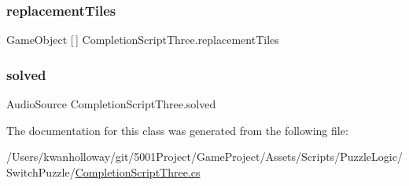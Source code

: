 \subsubsection{\texorpdfstring{replacement\+Tiles}{replacementTiles}}
{\footnotesize\ttfamily Game\+Object \mbox{[}$\,$\mbox{]} Completion\+Script\+Three.\+replacement\+Tiles}

\mbox{\label{class_completion_script_three_ac7eba76f069c14642b9fbbf1dbffd81d}} 
\subsubsection{\texorpdfstring{solved}{solved}}
{\footnotesize\ttfamily Audio\+Source Completion\+Script\+Three.\+solved}



The documentation for this class was generated from the following file\+:\begin{DoxyCompactItemize}
\item 
/\+Users/kwanholloway/git/5001\+Project/\+Game\+Project/\+Assets/\+Scripts/\+Puzzle\+Logic/\+Switch\+Puzzle/\hyperlink{_completion_script_three_8cs}{Completion\+Script\+Three.\+cs}\end{DoxyCompactItemize}
